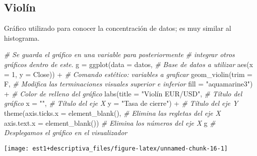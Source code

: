 \documentclass[
]{book}
\newenvironment{Shaded}{\begin{snugshade}}{\end{snugshade}}
\newcommand{\AttributeTok}[1]{\textcolor[rgb]{0.77,0.63,0.00}{#1}}
\newcommand{\CommentTok}[1]{\textcolor[rgb]{0.56,0.35,0.01}{\textit{#1}}}
\newcommand{\DecValTok}[1]{\textcolor[rgb]{0.00,0.00,0.81}{#1}}
\newcommand{\FunctionTok}[1]{\textcolor[rgb]{0.00,0.00,0.00}{#1}}
\newcommand{\NormalTok}[1]{#1}
\newcommand{\OtherTok}[1]{\textcolor[rgb]{0.56,0.35,0.01}{#1}}
\newcommand{\SpecialCharTok}[1]{\textcolor[rgb]{0.00,0.00,0.00}{#1}}
\newcommand{\StringTok}[1]{\textcolor[rgb]{0.31,0.60,0.02}{#1}}
\begin{document}
\hypertarget{violuxedn}{%
\subsection{Violín}\label{violuxedn}}

Gráfico utilizado para conocer la concentración de datos; es muy similar al histograma.

\begin{Shaded}
\begin{Highlighting}[]
\CommentTok{\# Se guarda el gráfico en una variable para posteriormente}
\CommentTok{\# integrar otros gráficos dentro de este.}
\NormalTok{g }\OtherTok{=} \FunctionTok{ggplot}\NormalTok{(}\AttributeTok{data =}\NormalTok{ datos, }\CommentTok{\# Base de datos a utilizar}
           \FunctionTok{aes}\NormalTok{(}\AttributeTok{x =} \DecValTok{1}\NormalTok{, }\AttributeTok{y =}\NormalTok{ Close)) }\SpecialCharTok{+} \CommentTok{\# Comando estético: variables a graficar }
  \FunctionTok{geom\_violin}\NormalTok{(}\AttributeTok{trim =}\NormalTok{ F, }\CommentTok{\# Modifica las terminaciones visuales superior e inferior}
              \AttributeTok{fill =} \StringTok{"aquamarine3"}\NormalTok{) }\SpecialCharTok{+} \CommentTok{\# Color de relleno del gráfico}
  \FunctionTok{labs}\NormalTok{(}\AttributeTok{title =} \StringTok{"Violín EUR/USD"}\NormalTok{, }\CommentTok{\# Título del gráfico}
       \AttributeTok{x =} \StringTok{""}\NormalTok{, }\CommentTok{\# Título del eje X}
       \AttributeTok{y =} \StringTok{"Tasa de cierre"}\NormalTok{) }\SpecialCharTok{+} \CommentTok{\# Título del eje Y}
  \FunctionTok{theme}\NormalTok{(}\AttributeTok{axis.ticks.x =} \FunctionTok{element\_blank}\NormalTok{(), }\CommentTok{\# Elimina las regletas del eje X}
        \AttributeTok{axis.text.x =} \FunctionTok{element\_blank}\NormalTok{()) }\CommentTok{\# Elimina los números del eje X}
\NormalTok{g }\CommentTok{\# Desplegamos el gráfico en el visualizador}
\end{Highlighting}
\end{Shaded}

\begin{center}\texttt{[image: est1+descriptiva\_files/figure-latex/unnamed-chunk-16-1]} \end{center}
\end{document}
